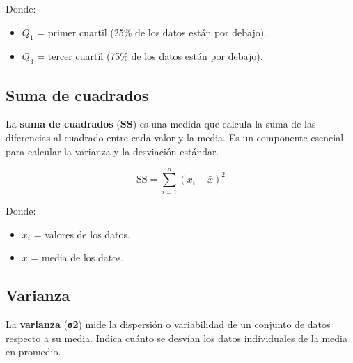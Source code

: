 \documentclass[
  letterpaper,
  DIV=11,
  numbers=noendperiod]{scrreprt}
\providecommand{\tightlist}{%
  \setlength{\itemsep}{0pt}\setlength{\parskip}{0pt}}
\begin{document}
Donde:

\begin{itemize}
\tightlist
\item
  \(Q_{1}\) = primer cuartil (25\% de los datos están por debajo).
\item
  \(Q_{3}\) = tercer cuartil (75\% de los datos están por debajo).
\end{itemize}

\subsection{Suma de cuadrados}\label{suma-de-cuadrados}

La \textbf{suma de cuadrados} (\textbf{SS}) es una medida que calcula la
suma de las diferencias al cuadrado entre cada valor y la media. Es un
componente esencial para calcular la varianza y la desviación estándar.

\[
\text{SS} = \sum_{i=1}^{n} (x_i - \bar{x})^2
\]

Donde:

\begin{itemize}
\tightlist
\item
  \(x_i\) = valores de los datos.
\item
  \(\bar{x}\) = media de los datos.
\end{itemize}

\subsection{Varianza}\label{varianza}

La \textbf{varianza} (\textbf{σ2}) mide la dispersión o variabilidad de
un conjunto de datos respecto a su media. Indica cuánto se desvían los
datos individuales de la media en promedio.
\end{document}

